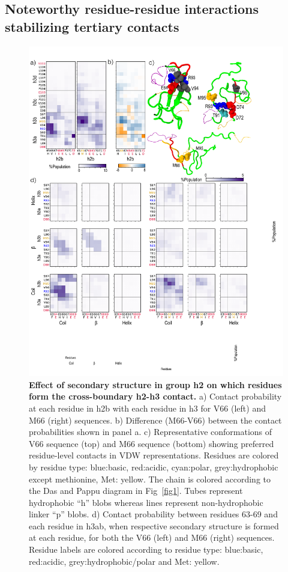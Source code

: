 \documentclass[10pt,letterpaper]{article}
\begin{document}
\subsection*{Noteworthy residue-residue interactions stabilizing tertiary contacts}
\label{sec:residuelevel}
\begin{figure}[!ht]
\includegraphics[scale=0.5,width=\textwidth,trim={0 0cm 0 0cm},clip]{./figures/fig7.pdf}
\caption{{\bf Effect of secondary structure in group h2 on which residues form the cross-boundary h2-h3 contact.} a) Contact probability at each residue in h2b with each residue in h3 for V66 (left) and M66 (right) sequences. b) Difference (M66-V66) between the contact probabilities shown in panel a. c) Representative conformations of V66 sequence (top) and M66 sequence (bottom) showing preferred residue-level contacts in VDW representations. Residues are colored by residue type: blue:basic, red:acidic, cyan:polar, grey:hydrophobic except methionine, Met: yellow. The chain is colored according to the Das and Pappu diagram in Fig~\ref{fig1}. Tubes represent hydrophobic ``h'' blobs whereas lines represent non-hydrophobic linker ``p'' blobs. d) Contact probability between residues 63-69 and each residue in h3ab, when respective secondary structure is formed at each residue, for both the V66 (left) and M66 (right) sequences. Residue labels are colored according to residue type: blue:basic, red:acidic, grey:hydrophobic/polar and Met: yellow.}
\label{fig7}
\end{figure}
\end{document}
